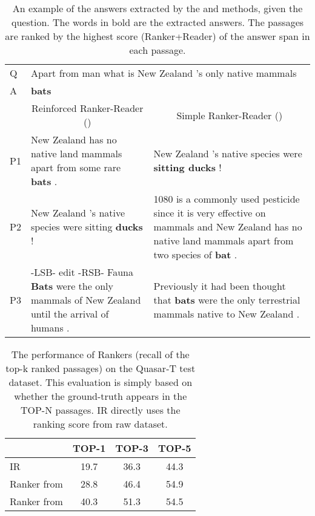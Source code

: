 \documentclass[letterpaper]{article} \usepackage{aaai18}  \usepackage{times}  \usepackage{helvet}  \usepackage{courier}  \usepackage{url}  \usepackage{graphicx}  \usepackage{comment}
\begin{document}
\begin{table*}[]
\centering
\small
\begin{tabular}{lll}
\toprule
Q & \multicolumn{2}{l}{Apart from man what is New Zealand 's only native mammals}  \\
A  & \multicolumn{2}{l}{\textbf{bats}} \\
\midrule
         & \multicolumn{1}{c}{Reinforced Ranker-Reader ()}                           & \multicolumn{1}{c}{Simple Ranker-Reader ()}                                                                                         \\
P1 & \multicolumn{1}{p{8cm}}{New Zealand has no native land mammals apart from some rare \textbf{bats} . } &\multicolumn{1}{p{8cm}}{ New Zealand 's native species were \textbf{sitting ducks} ! } \\
P2 & \multicolumn{1}{p{8cm}}{New Zealand 's native species were sitting \textbf{ducks} !   }  & 
\multicolumn{1}{p{8cm}}{1080 is a commonly used pesticide since it is very effective on mammals and New Zealand has no native land mammals apart from two species of \textbf{bat} .                          } \\
P3 & \multicolumn{1}{p{8cm}}{-LSB- edit -RSB- Fauna \textbf{Bats} were the only mammals of New Zealand until the arrival of humans . } & \multicolumn{1}{p{8cm}}{Previously it had been thought that \textbf{bats} were the only terrestrial mammals native to New Zealand .                             }
\\ \bottomrule
\end{tabular}
\normalsize
\caption{An example of the answers extracted by the  and  methods, given the question. The words in bold are the extracted answers. The passages are ranked by the highest score (Ranker+Reader) of the answer span in each passage. 
}
\label{tab:analysis2}
\end{table*}

\begin{table}[t]
\centering
\begin{tabular}{lccc}
\toprule
              & TOP-1 & TOP-3 & TOP-5 \\
\midrule
IR            & 19.7 & 36.3 & 44.3 \\
Ranker from  & 28.8 & 46.4 & 54.9 \\
Ranker from   & 40.3 & 51.3 & 54.5 \\
 \bottomrule
\end{tabular}
\caption{The performance of Rankers (recall of the top-k ranked passages) on the Quasar-T test dataset. This evaluation is simply based on whether the ground-truth appears in the TOP-N passages. IR directly uses the ranking score from raw dataset.}
\label{tab:ranker_analysis}
\end{table}
\end{document}
